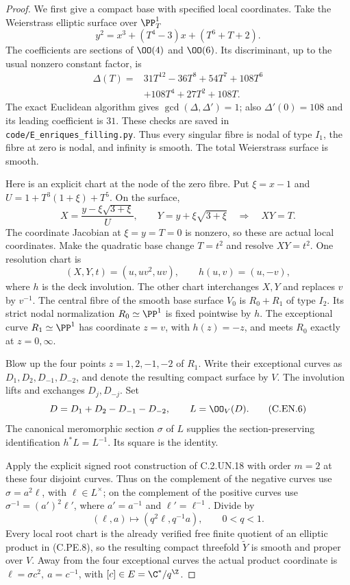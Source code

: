 \begin{proof}
We first give a compact base with specified local
coordinates. Take the Weierstrass elliptic surface
over $\PP^1_T$
\[
 y^2=x^3+(T^4-3)x+(T^6+T+2).                       \tag{C.EN.2}
\]
The coefficients are sections of $\OO(4)$ and
$\OO(6)$. Its discriminant, up to the usual nonzero
constant factor, is
\[
 \begin{split}
 \Delta(T)={}&31T^{12}-36T^8+54T^7+108T^6\\
             &+108T^4+27T^2+108T .
 \end{split}                                       \tag{C.EN.3}
\]
The exact Euclidean algorithm gives
$\gcd(\Delta,\Delta')=1$; also
$\Delta'(0)=108$ and its leading coefficient is
$31$. These checks are saved in
\texttt{code/E\_enriques\_filling.py}.
Thus every singular fibre is nodal of type $I_1$,
the fibre at zero is nodal, and infinity is smooth.
The total Weierstrass surface is smooth.

Here is an explicit chart at the node of the
zero fibre. Put $\xi=x-1$ and
$U=1+T^3(1+\xi)+T^5$. On the surface,
\[
 X=\frac{y-\xi\sqrt{3+\xi}}{U},\qquad
 Y=y+\xi\sqrt{3+\xi}
 \quad\Longrightarrow\quad XY=T .                  \tag{C.EN.4}
\]
The coordinate Jacobian at $\xi=y=T=0$ is
nonzero, so these are actual local coordinates.
Make the quadratic base change $T=t^2$ and
resolve $XY=t^2$. One resolution chart is
\[
       (X,Y,t)=(u,uv^2,uv),\qquad
       h(u,v)=(u,-v),                              \tag{C.EN.5}
\]
where $h$ is the deck involution. The other chart
interchanges $X,Y$ and replaces $v$ by $v^{-1}$.
The central fibre of the smooth base surface $V_0$
is $R_0+R_1$ of type $I_2$. Its strict nodal
normalization $R_0\simeq\PP^1$ is fixed pointwise
by $h$. The exceptional curve $R_1\simeq\PP^1$
has coordinate $z=v$, with $h(z)=-z$, and
meets $R_0$ exactly at $z=0,\infty$.

Blow up the four points $z=1,2,-1,-2$ of $R_1$.
Write their exceptional curves as
$D_1,D_2,D_{-1},D_{-2}$, and denote the resulting
compact surface by $V$. The involution lifts
and exchanges $D_j,D_{-j}$. Set
\[
 D=D_1+D_2-D_{-1}-D_{-2},\qquad L=\OO_V(D).
                                                               \tag{C.EN.6}
\]
The canonical meromorphic section $\sigma$ of
$L$ supplies the section-preserving identification
$h^*L=L^{-1}$. Its square is the identity.

Apply the explicit signed root construction of
C.2.UN.18 with order $m=2$ at these four disjoint
curves. Thus on the complement of the negative
curves use $\sigma=a^2\ell$, with $\ell\in L^\times$;
on the complement of the positive curves use
$\sigma^{-1}=(a')^2\ell'$, where
$a'=a^{-1}$ and $\ell'=\ell^{-1}$. Divide by
\[
       (\ell,a)\longmapsto(q^2\ell,q^{-1}a),
                  \qquad 0<q<1 .                  \tag{C.EN.7}
\]
Every local root chart is the already verified
free finite quotient of an elliptic product in
(C.PE.8), so the resulting compact threefold
$\widetilde Y$ is smooth and proper over $V$.
Away from the four exceptional curves the
actual product coordinate is
$\ell=\sigma c^2,\ a=c^{-1}$, with
$[c]\in E=\C^*/q^{\Z}$.


\end{proof}
